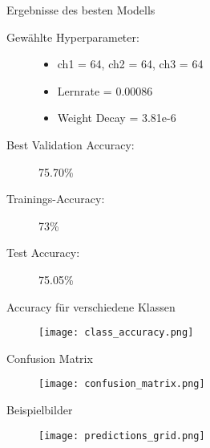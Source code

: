 \begin{frame}{Ergebnisse des besten Modells}

\begin{description}
    \item[Gewählte Hyperparameter:]
        \begin{itemize}
            \item ch1 = 64, ch2 = 64, ch3 = 64
            \item Lernrate = 0.00086
            \item Weight Decay = 3.81e-6
        \end{itemize}

    \item[Best Validation Accuracy:] \alert{75.70\%}
    
    \item[Trainings-Accuracy:] \alert{73\%}

    \item[Test Accuracy:] \alert{75.05\%}
\end{description}
\end{frame}


\begin{frame}{Accuracy für verschiedene Klassen}
    \begin{figure}
        \centering
        \texttt{[image: class\_accuracy.png]}
    \end{figure}
\end{frame}


\begin{frame}{Confusion Matrix}
    \begin{figure}
        \centering
        \texttt{[image: confusion\_matrix.png]}
    \end{figure}
\end{frame}


\begin{frame}{Beispielbilder}
    \begin{figure}
        \centering
        \texttt{[image: predictions\_grid.png]}
    \end{figure}
\end{frame}

